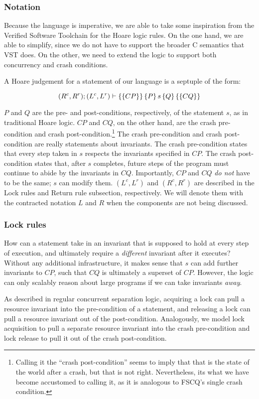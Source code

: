 \subsubsection{Notation}
Because the language is imperative, we are able to take some inspiration from
the Verified Software Toolchain for the Hoare logic rules. On the one hand, we
are able to simplify, since we do not have to support the broader C semantics
that VST does. On the other, we need to extend the logic to support both
concurrency and crash conditions.

A Hoare judgement for a statement of our language is a septuple of the form:

$$(R^c,R^r); (L^c,L^r) \vdash \left\{\left\{ CP \right\}\right\} \left\{ P \right\} s \left\{ Q \right\} \left\{\left\{ CQ \right\}\right\}$$

$P$ and $Q$ are the pre- and post-conditions, respectively, of the statement
$s$, as in traditional Hoare logic. $CP$ and $CQ$, on the other hand, are the
crash pre-condition and crash post-condition.\footnote{Calling it the ``crash
post-condition'' seems to imply that that is the state of the world after a
crash, but that is not right. Nevertheless, its what we have become accustomed
to calling it, as it is analogous to FSCQ's single crash condition.} The crash
pre-condition and crash post-condition are really statements about invariants.
The crash pre-condition states that every step taken in $s$ respects the
invariants specified in $CP$. The crash post-condition states that, after $s$
completes, future steps of the program must continue to abide by the invariants
in $CQ$. Importantly, $CP$ and $CQ$ \textit{do not} have to be the same; $s$
can modify them. $(L^c,L^r)$ and $(R^c,R^r)$ are described in the Lock rules
and Return rule subsection, respectively. We will denote them with the
contracted notation $L$ and $R$ when the components are not being discussed.

\subsubsection{Lock rules}

How can a statement take in an invariant that is supposed to hold at every step
of execution, and ultimately require a \textit{different} invariant after it
executes? Without any additional infrastructure, it makes sense that $s$ can add
further invariants to $CP$, such that $CQ$ is ultimately a superset of $CP$.
However, the logic can only scalably reason about large programs if we can
take invariants \textit{away}.

As described in regular concurrent separation logic, acquiring a lock can pull a
resource invariant into the pre-condition of a statement, and releasing a lock
can pull a resource invariant out of the post-condition. Analogously, we model
lock acquisition to pull a separate resource invariant into the crash
pre-condition and lock release to pull it out of the crash post-condition.

